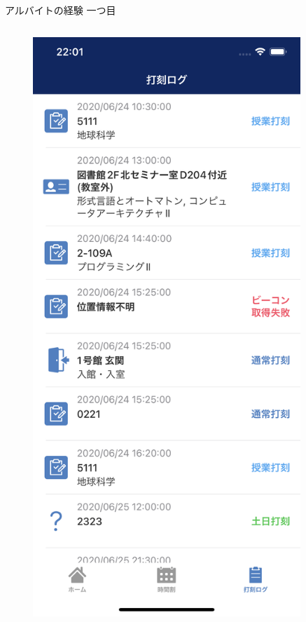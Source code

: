 \documentclass[12pt, unicode]{beamer}
\begin{document}
\begin{frame}{アルバイトの経験 一つ目}
\begin{columns}
    \begin{column}{0.3\textwidth}
      \begin{figure}[h]
        \centering
        \includegraphics[width=0.9\textwidth]{pictures/PyrrolineStamp.png}
      \end{figure}
    \end{column}
  \end{columns}
\end{frame}
\end{document}
